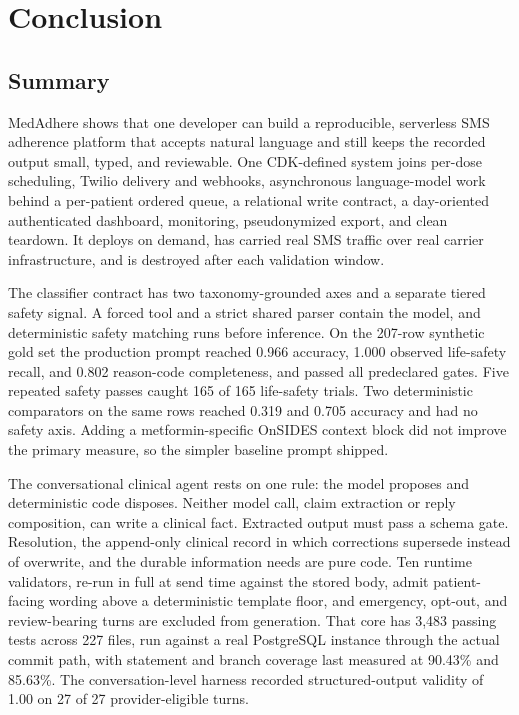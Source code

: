 \chapter{Conclusion}
\label{ch:conclusion}

\section{Summary}

MedAdhere shows that one developer can build a reproducible, serverless SMS
adherence platform that accepts natural language and still keeps the recorded
output small, typed, and reviewable. One CDK-defined system joins per-dose
scheduling, Twilio delivery and webhooks, asynchronous language-model work
behind a per-patient ordered queue, a relational write contract, a day-oriented
authenticated dashboard, monitoring, pseudonymized export, and clean teardown.
It deploys on demand, has carried real SMS traffic over real carrier
infrastructure, and is destroyed after each validation window.

The classifier contract has two taxonomy-grounded axes and a separate tiered
safety signal. A forced tool and a strict shared parser contain the model, and
deterministic safety matching runs before inference. On the 207-row synthetic
gold set the production prompt reached 0.966 accuracy, 1.000 observed
life-safety recall, and 0.802 reason-code completeness, and passed all
predeclared gates. Five repeated safety passes caught 165 of 165 life-safety
trials. Two deterministic comparators on the same rows reached 0.319 and 0.705
accuracy and had no safety axis. Adding a metformin-specific OnSIDES context
block did not improve the primary measure, so the simpler baseline prompt
shipped.

The conversational clinical agent rests on one rule: the model proposes and
deterministic code disposes. Neither model call, claim extraction or reply
composition, can write a clinical fact. Extracted output must pass a schema
gate. Resolution, the append-only clinical record in which corrections
supersede instead of overwrite, and the durable information needs are pure
code. Ten runtime validators, re-run in full at send time against the stored
body, admit patient-facing wording above a deterministic template floor, and
emergency, opt-out, and review-bearing turns are excluded from generation. That
core has 3{,}483 passing tests across 227 files, run against a real PostgreSQL
instance through the actual commit path, with statement and branch coverage
last measured at 90.43\% and 85.63\%. The conversation-level harness recorded
structured-output validity of 1.00 on 27 of 27 provider-eligible turns.

